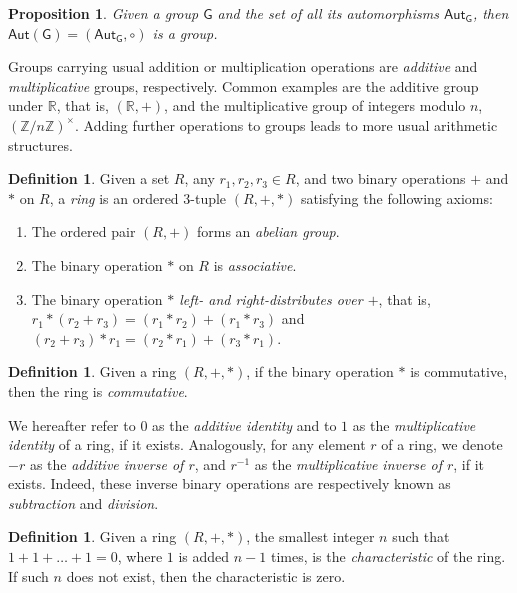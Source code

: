 \documentclass[12pt, a4paper, oneside]{memoir}
\newtheorem{proposition}[theorem]{Proposition}
\theoremstyle{definition}
\newtheorem{definition}[theorem]{Definition}
\begin{document}
\begin{proposition}\label{prop:group-aut}
  Given a group $\mathsf{G}$ and the set of all its automorphisms $\mathsf{Aut}_{\mathsf{G}}$, then $\mathsf{Aut}(\mathsf{G}) = (\mathsf{Aut}_{\mathsf{G}}, \circ)$ is a group.
\end{proposition}

Groups carrying usual addition or multiplication operations are \emph{additive} and \emph{multiplicative} groups, respectively. Common examples are the additive group under $\mathbb{R}$, that is, $(\mathbb{R}, +)$, and the multiplicative group of integers modulo $n$, $(\mathbb{Z}/n\mathbb{Z})^{\times}$. Adding further operations to groups leads to more usual arithmetic structures.

\begin{definition}
  Given a set $R$, any $r_{1}, r_{2}, r_{3} \in R$, and two binary operations $+$ and $\ast$ on $R$, a \emph{ring} is an ordered 3-tuple $(R, +, \ast)$ satisfying the following axioms:
  
  \begin{enumerate}
    \item The ordered pair $(R, +)$ forms an \emph{abelian group}.
    \item The binary operation $\ast$ on $R$ is \emph{associative}.
    \item The binary operation \emph{$\ast$ left- and right-distributes over $+$}, that is, $r_{1} \ast (r_{2} + r_{3}) = (r_{1} \ast r_{2}) + (r_{1} \ast r_{3})$ and $(r_{2} + r_{3}) \ast r_{1} = (r_{2} \ast r_{1}) + (r_{3} \ast r_{1})$.
  \end{enumerate}
\end{definition}

\begin{definition}
  Given a ring $(R, +, \ast)$, if the binary operation $\ast$ is commutative, then the ring is \emph{commutative}.
\end{definition}

We hereafter refer to $0$ as the \emph{additive identity} and to $1$ as the \emph{multiplicative identity} of a ring, if it exists. Analogously, for any element $r$ of a ring, we denote $-r$ as the \emph{additive inverse of $r$}, and $r^{-1}$ as the \emph{multiplicative inverse of $r$}, if it exists. Indeed, these inverse binary operations are respectively known as \emph{subtraction} and \emph{division}.

\begin{definition}
  Given a ring $(R, +, \ast)$, the smallest integer $n$ such that $1 + 1 + \dots + 1 = 0$, where $1$ is added $n - 1$ times, is the \emph{characteristic} of the ring. If such $n$ does not exist, then the characteristic is zero.
\end{definition}
\end{document}
